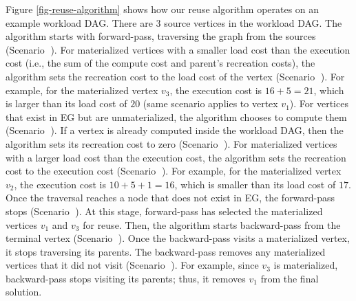 Figure \ref{fig-reuse-algorithm} shows how our reuse algorithm operates on an example workload DAG.
There are 3 source vertices in the workload DAG.
The algorithm starts with forward-pass, traversing the graph from the sources (Scenario \textcircled{}).
For materialized vertices with a smaller load cost than the execution cost (i.e., the sum of the compute cost and parent's recreation costs), the algorithm sets the recreation cost to the load cost of the vertex (Scenario \textcircled{}).
For example, for the materialized vertex $v_3$, the execution cost is $16 + 5 = 21$, which is larger than its load cost of $20$ (same scenario applies to vertex $v_1$).
For vertices that exist in EG but are unmaterialized, the algorithm chooses to compute them (Scenario \textcircled{}).
If a vertex is already computed inside the workload DAG, then the algorithm sets its recreation cost to zero (Scenario \textcircled{}).
For materialized vertices with a larger load cost than the execution cost, the algorithm sets the recreation cost to the execution cost (Scenario \textcircled{}).
For example, for the materialized vertex $v_2$, the execution cost is $10 + 5 + 1 = 16$, which is smaller than its load cost of $17$.
Once the traversal reaches a node that does not exist in EG, the forward-pass stops (Scenario \textcircled{}).
At this stage, forward-pass has selected the materialized vertices $v_1$ and $v_3$ for reuse.
Then, the algorithm starts backward-pass from the terminal vertex (Scenario \textcircled{}).
Once the backward-pass visits a materialized vertex, it stops traversing its parents.
The backward-pass removes any materialized vertices that it did not visit (Scenario \textcircled{}).
For example, since $v_3$ is materialized, backward-pass stops visiting its parents; thus, it removes $v_1$ from the final solution.

